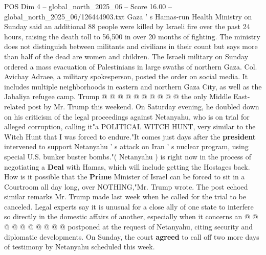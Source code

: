 \begin{textsample}{POS Dim 4 – global\_north\_2025\_06 – Score 16.00 – global\_north\_2025\_06/126444903.txt}
Gaza ' s Hamas-run Health Ministry on Sunday said an additional 88 people were killed by Israeli fire over the past 24 hours, raising the death toll to 56,500 in over 20 months of fighting.
The ministry does not distinguish between militants and civilians in their count but says more than half of the dead are women and children.
The Israeli military on Sunday ordered a mass evacuation of Palestinians in large swaths of northern Gaza.
Col.
Avichay Adraee, a military spokesperson, posted the order on social media.
It includes multiple neighborhoods in eastern and northern Gaza City, as well as the Jabaliya refugee camp.
Trump @ @ @ @ @ @ @ @ @ @ the only Middle East-related post by Mr.
Trump this weekend.
On Saturday evening, he doubled down on his criticism of the legal proceedings against Netanyahu, who is on trial for alleged corruption, calling it"a POLITICAL WITCH HUNT, very similar to the Witch Hunt that I was forced to endure."It comes just days after the \textbf{president} intervened to support Netanyahu ' s attack on Iran ' s nuclear program, using special U.S. bunker buster bombs."( Netanyahu ) is right now in the process of negotiating a \textbf{Deal} with Hamas, which will include getting the Hostages back.
How is it possible that the \textbf{Prime} Minister of Israel can be forced to sit in a Courtroom all day long, over NOTHING,"Mr.
Trump wrote.
The post echoed similar remarks Mr.
Trump made last week when he called for the trial to be canceled.
Legal experts say it is unusual for a close ally of one state to interfere so directly in the domestic affairs of another, especially when it concerns an @ @ @ @ @ @ @ @ @ @ postponed at the request of Netanyahu, citing security and diplomatic developments.
On Sunday, the court \textbf{agreed} to call off two more days of testimony by Netanyahu scheduled this week.

\end{textsample}
